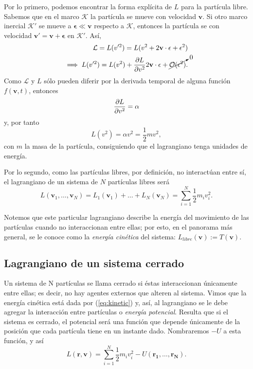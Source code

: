Por lo primero, podemos encontrar la forma explícita de $L$ para la partícula libre. Sabemos que en el marco $\mathcal{K}$ la partícula se mueve con velocidad $\mathbf{v}$. Si otro marco inercial $\mathcal{K}'$ se mueve a $\mathbf{\epsilon} \ll \mathbf{v}$ respecto a $\mathcal{K}$, entonces la partícula se con velocidad $\mathbf{v}' = \mathbf{v} + \mathbf{\epsilon}$ en $\mathcal{K}'$. Así,
\begin{align*}
 \mathcal{L} = L(v'^2) = L(v^2 + 2 \mathbf{v} \cdot \mathbf{\epsilon} + \epsilon^2) \\
 \implies  L(v'^2) = L(v^2) + \frac{\partial L}{\partial v^2} 2 \mathbf{v} \cdot \mathbf{\epsilon} + \cancelto{0}{\mathcal{O}(\epsilon^2)}.
\end{align*}
Como $\mathcal{L}$ y $L$ sólo pueden diferir por la derivada temporal de alguna función $f(\mathbf{v},t)$, entonces
\begin{align*}
 \frac{\partial L}{\partial v^2} = \alpha
\end{align*}
y, por tanto
\begin{equation}
 L(v^2) = \alpha v^2 = \frac{1}{2}m v^2,
\end{equation}
con $m$ la masa de la partícula, consiguiendo que el lagrangiano tenga unidades de energía.

Por lo segundo, como las partículas libres, por definición, no interactúan entre sí, el lagrangiano de un sistema de $N$ partículas libres será
\begin{equation}
 L(\mathbf{v}_1, \ldots, \mathbf{v}_N) = L_1(\mathbf{v}_1) + \ldots + L_N(\mathbf{v}_N) = \sum_{i=1}^N \frac{1}{2}m_i v_i^2.
 \label{eq:kinetic}
\end{equation}

Notemos que este particular lagrangiano describe la energía del movimiento de las partículas cuando no interaccionan entre ellas; por esto, en el panorama más general, se le conoce como la \textit{energía cinética} del sistema: $L_{libre}(\mathbf{v}) := T(\mathbf{v})$.

\subsection{Lagrangiano de un sistema cerrado} 

Un sistema de N partículas se llama cerrado si éstas interaccionan únicamente entre ellas; es decir, no hay agentes externos que alteren al sistema. Vimos que la energía cinética está dada por (\ref{eq:kinetic}) y, así, al lagrangiano se le debe agregar la interacción entre partículas o \textit{energía potencial}. Resulta que si el sistema es cerrado, el potencial será una función que depende únicamente de la posición que cada partícula tiene en un instante dado. Nombraremos $-U$ a esta función, y así
\begin{equation}
 L(\mathbf{r},\mathbf{v}) = \sum_{i=1}^N \frac{1}{2}m_i v_i^2 -U(\mathbf{r_1},\ldots,\mathbf{r_N}).
 \label{eq:lagrangian_cartesian_closed}
\end{equation} 

